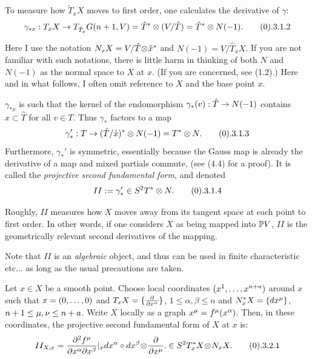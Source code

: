 To measure how $\tilde T_xX$ moves to first order, one
calculates the derivative of $\gamma$:
$$
\gamma_{*x} : T_{x}X\ra T_{\hat T_{x}}G(n+1,V)
= \hat T^*\otimes (V/\hat T) =\hat T^*\otimes N(-1). \tag 0.3.1.2
$$


Here I use the notation $N_xX= V/\hat T\!\otimes\! \hat x^*$ and
$N(-1)=V/\hat T_xX$. If you are not familiar with such notations,
there is little harm in thinking of both $N$ and $N(-1)$ as
the normal space to $X$ at $x$. (If you are
concerned, see (1.2).)   Here and in what follows, I often
omit reference to $X$ and the base point $x$. 



$\gamma_{*x}$ is such that  the kernel of the endomorphism
$\gamma_*(v):\hat T\rightarrow N(-1)$ contains $\hat x\subset\hat T$
 for all $v\in T$.  Thus  $\gamma_*$ factors to a map
$$
\gamma_*' : T\ra (\hat T/\hat x )^*\otimes N(-1)= T^*\otimes N. \tag
0.3.1.3
$$
Furthermore, $\gamma_*'$ is symmetric, 
essentially because the Gauss map is
already the derivative of a map and mixed partials commute,
(see (4.4) for a proof).  It is called the
{\it projective second fundamental form}, and denoted
$$
II:= \gamma_*'\in S^2T^*\otimes N. \tag 0.3.1.4
$$


Roughly, $II$ measures how $X$ moves away from its tangent space at each
point
to first order.  In other words, if one considers $X$ as being mapped into
$\Bbb P V$, $II$ is  the geometrically relevant second derivatives of the
mapping.     

\smallpagebreak

 Note  that $II$ is an {\it algebraic} object, and thus
can be used in finite characteristic etc... as long as the usual
precautions are taken.  


\smallpagebreak

 

Let $x\in X$ be a smooth point. Choose local coordinates 
$(x^{1}, \hdots ,x^{n+a} )$ around $x$ such that
$x=(0, \hdots , 0)$ and
$T_xX= \{ \frac{\partial {}}{\partial {x^{\alpha}}}\}$, $1\leq\alpha,\beta\leq n$
and $N^*_xX = \{ dx^{\mu}\}$, $n+1\leq\mu,\nu\leq n+a$.
Write $X$ locally as a graph $x^{\mu} = f^{\mu}(x^{\alpha} )$. Then,
in these coordinates, 
the
projective second fundamental form of $X$ at $x$ is:
$$
II_{X,x}=  \frac{\partial^2 f^{\mu}}{\partial \xx\alpha
\partial \xx\beta}|_x
d{\xx\alpha}\circ d{\xx
\beta}\ot 
\frp {}{\xx\mu} .
\in S^2T^*_xX\ot N_xX.\tag 0.3.2.1
$$


